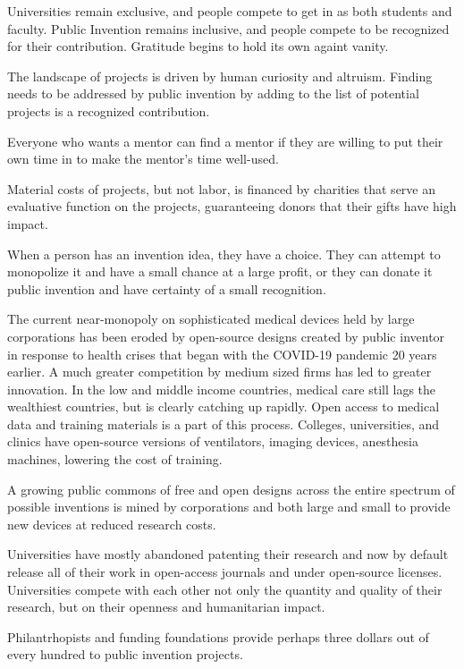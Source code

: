 \documentclass[
	fontsize=10pt, %
	twoside=false, %
	secnumdepth=1, %
]{kaobook}
\begin{document}
Universities remain exclusive, and people compete to get in as
both students and faculty.
Public Invention remains inclusive, and people compete to
be recognized for their contribution. Gratitude begins
to hold its own againt vanity.

The landscape of projects is driven by human curiosity and
altruism. Finding needs to be addressed by public invention
by adding to the list of potential projects is a recognized
contribution.

Everyone who wants a mentor can find a mentor if they are willing
to put their own time in to make the mentor's time well-used.

Material costs of projects, but not labor, is financed by
charities that serve an evaluative function on the projects,
guaranteeing donors that their gifts have high impact.

When a person has an invention idea, they have a choice.
They can attempt to monopolize it and have a small chance at
a large profit, or they can donate it public invention and
have certainty of a small recognition.

The current near-monopoly on sophisticated medical devices held by
large corporations has been eroded by open-source designs
created by public inventor in response to health crises that
began with the COVID-19 pandemic 20 years earlier.
A much greater competition by medium sized firms has led to
greater innovation. In the low and middle income countries,
medical care still lags the wealthiest countries, but is
clearly catching up rapidly.
Open access to medical data and training materials is a
part of this process. Colleges, universities, and clinics
have open-source versions of ventilators, imaging devices,
anesthesia machines, lowering the cost of training.

A growing public commons of free and open designs
across the entire spectrum of possible inventions
is mined by corporations and both large and small to provide
new devices at reduced research costs.

Universities have mostly abandoned patenting their research
and now by default release all of their work in open-access journals
and under open-source licenses. Universities compete with each
other not only the quantity and quality of their research, but
on their openness and humanitarian impact.

Philantrhopists and funding foundations provide perhaps three
dollars out of every hundred to public invention projects.
\end{document}
